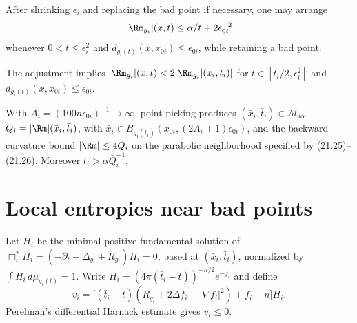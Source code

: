 \begin{lemma}
\label{lem:chow-iii-adjusted-bad-sequence}
After shrinking \(\epsilon_i\) and replacing the bad point if necessary, one
may arrange
\[
|\Rm_{g_i}|(x,t)\le\alpha/t+2\epsilon_{0i}^{-2}
\]
whenever \(0<t\le\epsilon_i^2\) and
\(d_{g_i(t)}(x,x_{0i})\le\epsilon_{0i}\), while retaining a bad point.
\end{lemma}

\begin{remark}
\label{rem:chow-iii-adjusted-local-bound}
The adjustment implies \(|\Rm_{g_i}|(x,t)<2|\Rm_{g_i}|(x_i,t_i)|\) for
\(t\in[t_i/2,\epsilon_i^2]\) and
\(d_{g_i(t)}(x,x_{0i})\le\epsilon_{0i}\).
\end{remark}

\begin{lemma}
\label{lem:chow-iii-well-chosen-points}
With \(A_i=(100n\epsilon_{0i})^{-1}\to\infty\), point picking produces
\((\bar x_i,\bar t_i)\in\mathcal M_{i\alpha}\),
\(\bar Q_i=|\Rm|(\bar x_i,\bar t_i)\), with
\(\bar x_i\in B_{g_i(\bar t_i)}(x_{0i},(2A_i+1)\epsilon_{0i})\), and the
backward curvature bound \(|\Rm|\le4\bar Q_i\) on the parabolic neighborhood
specified by (21.25)--(21.26).  Moreover \(\bar t_i>\alpha\bar Q_i^{-1}\).
\end{lemma}

\section{Local entropies near bad points}

\begin{definition}
\label{def:chow-iii-adjoint-entropy-quantities}
Let \(H_i\) be the minimal positive fundamental solution of
\(\Box_i^*H_i=(-\partial_t-\Delta_{g_i}+R_{g_i})H_i=0\), based at
\((\bar x_i,\bar t_i)\), normalized by \(\int H_i\,d\mu_{g_i(t)}=1\).  Write
\(H_i=(4\pi(\bar t_i-t))^{-n/2}e^{-f_i}\) and define
\[
v_i=\bigl[(\bar t_i-t)(R_{g_i}+2\Delta f_i-|\nabla f_i|^2)+f_i-n\bigr]H_i.
\]
Perelman's differential Harnack estimate gives \(v_i\le0\).
\end{definition}

